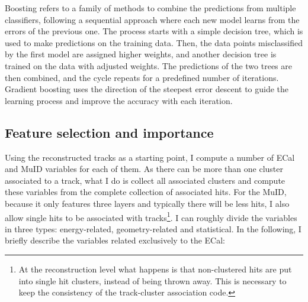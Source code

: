 Boosting refers to a family of methods to combine the predictions from multiple classifiers, following a sequential approach where each new model learns from the errors of the previous one. The process starts with a simple decision tree, which is used to make predictions on the training data. Then, the data points misclassified by the first model are assigned higher weights, and another decision tree is trained on the data with adjusted weights. The predictions of the two trees are then combined, and the cycle repeats for a predefined number of iterations. Gradient boosting uses the direction of the steepest error descent to guide the learning process and improve the accuracy with each iteration.

\subsection{Feature selection and importance}

Using the reconstructed tracks as a starting point, I compute a number of ECal and MuID variables for each of them. As there can be more than one cluster associated to a track, what I do is collect all associated clusters and compute these variables from the complete collection of associated hits. For the MuID, because it only features three layers and typically there will be less hits, I also allow single hits to be associated with tracks\footnote{At the reconstruction level what happens is that non-clustered hits are put into single hit clusters, instead of being thrown away. This is necessary to keep the consistency of the track-cluster association code.}. I can roughly divide the variables in three types: energy-related, geometry-related and statistical. In the following, I briefly describe the variables related exclusively to the ECal:

